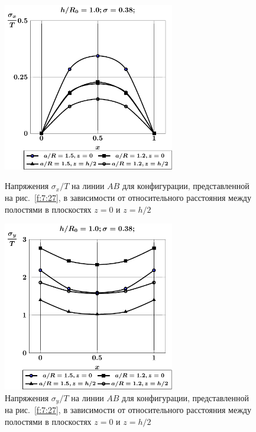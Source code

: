\begin{russian}
\begin{figure}[h!]
\centering\footnotesize
\parbox[b]{7.5cm}{\centering\includegraphics[width=7.5cm]{cav16-sig_x.pdf}
\caption{Напряжения $\sigma_x/T$ на линии $AB$ для конфигурации, представленной на рис.~\ref{f:7:27}, в зависимости от относительного расстояния между полостями в плоскостях $z=0$ и $z=h/2$
\label{f:7:28}}}\hfil\hfil
\parbox[b]{7.5cm}{\centering\includegraphics[width=7.5cm]{cav16-sig_y.pdf}
\caption{Напряжения $\sigma_y/T$ на линии $AB$ для конфигурации, представленной на рис.~\ref{f:7:27}, в зависимости от относительного расстояния между полостями в плоскостях $z=0$ и $z=h/2$
\label{f:7:29}}}
\end{figure}


\end{russian}
